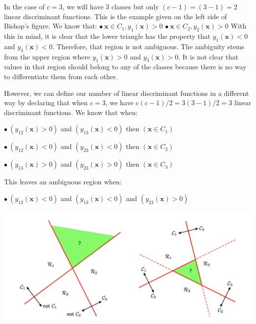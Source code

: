 \documentclass[12pt, letterpaper]{article}
\begin{document}
In the case of $c = 3$, we will have 3 classes but only $(c-1) = (3-1) = 2$ linear discriminant functions. This is the example given on the left side of Bishop's figure. We know that: \newline
$\bullet \ \mathbf{x} \in C_{1}, y_{1}(\mathbf{x})>0$ \newline
$\bullet\  \mathbf{x} \in C_{2}, y_{2}(\mathbf{x})>0$ \newline  With this in mind, it is clear that the lower triangle has the property that $y_{1}(\mathbf{x})<0$ and $y_{3}(\mathbf{x})<0$. Therefore, that region is not ambiguous. The ambiguity stems from the upper region where  $y_{1}(\mathbf{x})>0$ and $y_{3}(\mathbf{x})>0$. It is not clear that values in that region should belong to any of the classes because there is no way to differentiate them from each other.

However, we can define our number of linear discriminant functions in a different way by declaring that when $c=3$, we have $c(c-1)/2 = 3(3-1)/2 = 3$ linear discriminant functions. We know that when: \newline

$\bullet \ (y_{12}(\mathbf{x})>0)$ and $(y_{13}(\mathbf{x})<0)$ then $(\mathbf{x} \in C_{1})$\newline 

$\bullet \ (y_{12}(\mathbf{x})<0)$ and $(y_{23}(\mathbf{x})<0)$ then $(\mathbf{x} \in C_{2})$\newline 

$\bullet \ (y_{13}(\mathbf{x})>0)$ and $(y_{23}(\mathbf{x})>0)$ then $(\mathbf{x} \in C_{3})$\newline

This leaves an ambiguous region when: \newline

$\bullet \ (y_{12}(\mathbf{x})<0)$ and $(y_{13}(\mathbf{x})<0)$ and $(y_{23}(\mathbf{x})>0)$ \newline


\includegraphics[scale=0.7]{problem_2_a.png}
\end{document}
